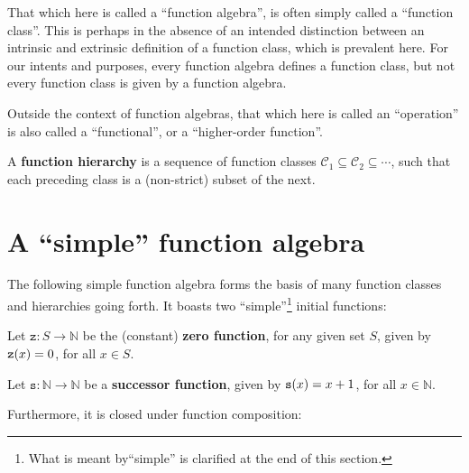 \begin{remark} That which here is called a ``function algebra'', is often
simply called a ``function class''. This is perhaps in the absence of an
intended distinction between an intrinsic and extrinsic definition of a
function class, which is prevalent here. For our intents and purposes, every
function algebra defines a function class, but not every function class is
given by a function algebra.  \end{remark} 

\begin{remark} Outside the context of function algebras, that which here is
called an ``operation'' is also called a ``functional'', or a ``higher-order
function''.\end{remark}

\begin{definition} A \textbf{function hierarchy} is a sequence of function
classes $\mathcal{C}_1 \subseteq \mathcal{C}_2 \subseteq \cdots$, such that
each preceding class is a (non-strict) subset of the
next.\end{definition}

\section{A ``simple'' function algebra}

The following simple function algebra forms the basis of many function classes
and hierarchies going forth. It boasts two ``simple''\footnote{What is meant
by``simple'' is clarified at the end of this section.} initial functions:

\begin{definition} \label{def:zero-function} Let $\mathtt{z} : S \rightarrow
\mathbb{N}$ be the (constant) \textbf{zero function}, for any given set $S$,
given by $\mathtt{z}{\mathopen{}\left({x}\right)\mathclose{}} = 0$, for all $x \in S$.  
\end{definition}

\begin{definition} \label{def:successor-function} Let $\mathtt{s} : \mathbb{N}
\rightarrow \mathbb{N}$ be a \textbf{successor function}, given by
$\mathtt{s}{\mathopen{}\left({x}\right)\mathclose{}} = x + 1$, for all $x \in \mathbb{N}$.
 \end{definition}

Furthermore, it is closed under function composition:

